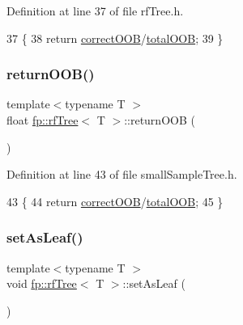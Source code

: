 Definition at line 37 of file rf\+Tree.\+h.


\begin{DoxyCode}
37                                         \{
38                     \textcolor{keywordflow}{return} \hyperlink{classfp_1_1rfTree_a83832650bcea8d63cdcd480d9ddc6e6e}{correctOOB}/\hyperlink{classfp_1_1rfTree_aa200dc228adc20c12e514364d2b674df}{totalOOB};
39                 \}
\end{DoxyCode}
\mbox{\label{classfp_1_1rfTree_aee6bf6e8e695392880f1cc9ac0102ba6}} 
\subsubsection{\texorpdfstring{return\+O\+O\+B()}{returnOOB()}\hspace{0.1cm}{\footnotesize\ttfamily [2/2]}}
{\footnotesize\ttfamily template$<$typename T $>$ \\
float \hyperlink{classfp_1_1rfTree}{fp\+::rf\+Tree}$<$ T $>$\+::return\+O\+OB (\begin{DoxyParamCaption}{ }\end{DoxyParamCaption})\hspace{0.3cm}{\ttfamily [inline]}}



Definition at line 43 of file small\+Sample\+Tree.\+h.


\begin{DoxyCode}
43                                         \{
44                     \textcolor{keywordflow}{return} \hyperlink{classfp_1_1rfTree_a83832650bcea8d63cdcd480d9ddc6e6e}{correctOOB}/\hyperlink{classfp_1_1rfTree_aa200dc228adc20c12e514364d2b674df}{totalOOB};
45                 \}
\end{DoxyCode}
\mbox{\label{classfp_1_1rfTree_a3583e1f1659ba9a9013a4891709bacb9}} 
\subsubsection{\texorpdfstring{set\+As\+Leaf()}{setAsLeaf()}\hspace{0.1cm}{\footnotesize\ttfamily [1/2]}}
{\footnotesize\ttfamily template$<$typename T $>$ \\
void \hyperlink{classfp_1_1rfTree}{fp\+::rf\+Tree}$<$ T $>$\+::set\+As\+Leaf (\begin{DoxyParamCaption}{ }\end{DoxyParamCaption})\hspace{0.3cm}{\ttfamily [inline]}}



